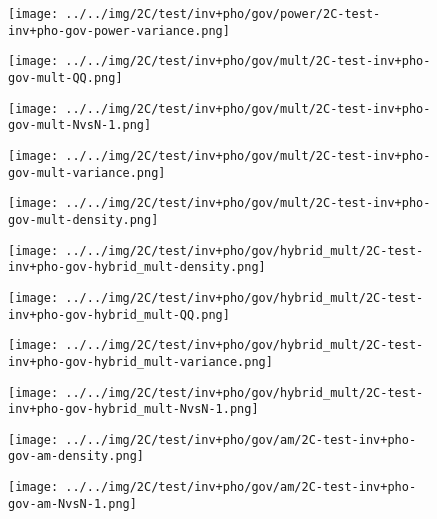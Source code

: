 \begin{figure}[H]
\centering	\texttt{[image: ../../img/2C/test/inv+pho/gov/power/2C-test-inv+pho-gov-power-variance.png]}
\end{figure}
\begin{figure}[H]
\centering	\texttt{[image: ../../img/2C/test/inv+pho/gov/mult/2C-test-inv+pho-gov-mult-QQ.png]}
\end{figure}
\begin{figure}[H]
\centering	\texttt{[image: ../../img/2C/test/inv+pho/gov/mult/2C-test-inv+pho-gov-mult-NvsN-1.png]}
\end{figure}
\begin{figure}[H]
\centering	\texttt{[image: ../../img/2C/test/inv+pho/gov/mult/2C-test-inv+pho-gov-mult-variance.png]}
\end{figure}
\begin{figure}[H]
\centering	\texttt{[image: ../../img/2C/test/inv+pho/gov/mult/2C-test-inv+pho-gov-mult-density.png]}
\end{figure}
\begin{figure}[H]
\centering	\texttt{[image: ../../img/2C/test/inv+pho/gov/hybrid\_mult/2C-test-inv+pho-gov-hybrid\_mult-density.png]}
\end{figure}
\begin{figure}[H]
\centering	\texttt{[image: ../../img/2C/test/inv+pho/gov/hybrid\_mult/2C-test-inv+pho-gov-hybrid\_mult-QQ.png]}
\end{figure}
\begin{figure}[H]
\centering	\texttt{[image: ../../img/2C/test/inv+pho/gov/hybrid\_mult/2C-test-inv+pho-gov-hybrid\_mult-variance.png]}
\end{figure}
\begin{figure}[H]
\centering	\texttt{[image: ../../img/2C/test/inv+pho/gov/hybrid\_mult/2C-test-inv+pho-gov-hybrid\_mult-NvsN-1.png]}
\end{figure}
\begin{figure}[H]
\centering	\texttt{[image: ../../img/2C/test/inv+pho/gov/am/2C-test-inv+pho-gov-am-density.png]}
\end{figure}
\begin{figure}[H]
\centering	\texttt{[image: ../../img/2C/test/inv+pho/gov/am/2C-test-inv+pho-gov-am-NvsN-1.png]}
\end{figure}
